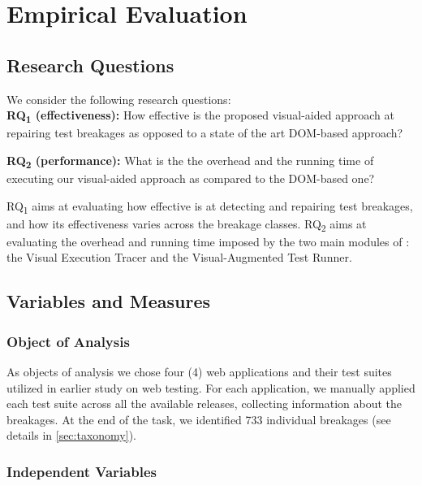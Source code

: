 
\section{Empirical Evaluation}\label{sec:evaluation}

\subsection{Research Questions}

We consider the following research questions: \\
\noindent
\textbf{RQ\textsubscript{1} (effectiveness):} 
How effective is the proposed visual-aided approach at repairing test breakages as opposed to a state of the art DOM-based approach?

\noindent
\textbf{RQ\textsubscript{2} (performance):} What is the the overhead and the running time of executing our visual-aided approach as compared to the DOM-based one?

RQ\textsubscript{1} aims at evaluating how effective \tool is at detecting and repairing test breakages, and how its effectiveness varies across the breakage classes. 
RQ\textsubscript{2} aims at evaluating the overhead and running time imposed by the two main modules of \tool: the Visual Execution Tracer and the Visual-Augmented Test Runner.

\subsection{Variables and Measures}

\subsubsection{Object of Analysis}

As objects of analysis we chose four (4) web applications and their test suites utilized in earlier study on web testing. For each application, we manually applied each test suite across all the available releases, collecting information about the breakages. At the end of the task, we identified 733 individual breakages (see details in \autoref{sec:taxonomy}).

\subsubsection{Independent Variables}

